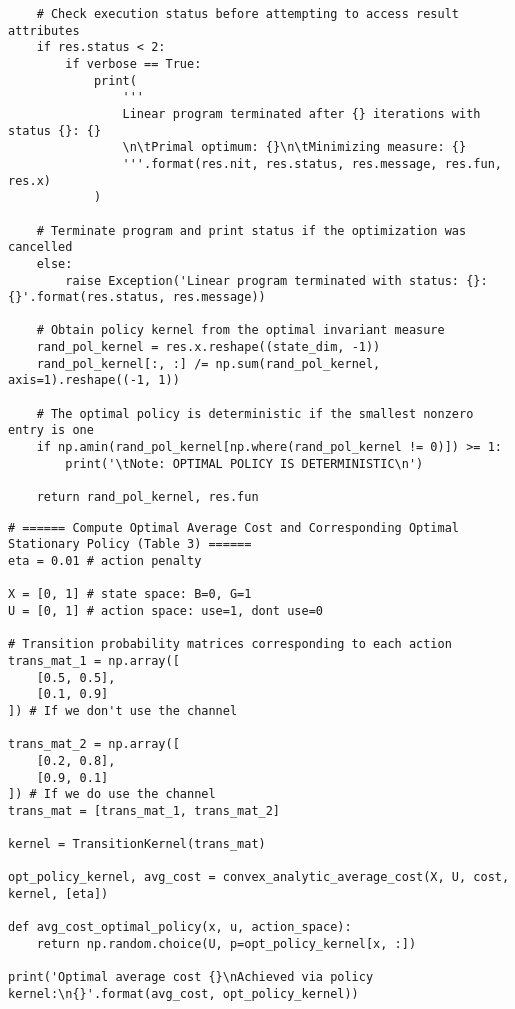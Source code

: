 \documentclass[10pt]{article}
\newcommand{\1}[1]{\mathbbm{1}_{#1}}
\begin{document}
\begin{verbatim}
    # Check execution status before attempting to access result attributes
    if res.status < 2:
        if verbose == True:
            print(
                '''
                Linear program terminated after {} iterations with status {}: {}
                \n\tPrimal optimum: {}\n\tMinimizing measure: {}
                '''.format(res.nit, res.status, res.message, res.fun, res.x)
            )
    
    # Terminate program and print status if the optimization was cancelled
    else:
        raise Exception('Linear program terminated with status: {}: {}'.format(res.status, res.message))

    # Obtain policy kernel from the optimal invariant measure
    rand_pol_kernel = res.x.reshape((state_dim, -1))
    rand_pol_kernel[:, :] /= np.sum(rand_pol_kernel, axis=1).reshape((-1, 1))
    
    # The optimal policy is deterministic if the smallest nonzero entry is one
    if np.amin(rand_pol_kernel[np.where(rand_pol_kernel != 0)]) >= 1:
        print('\tNote: OPTIMAL POLICY IS DETERMINISTIC\n')

    return rand_pol_kernel, res.fun
    \end{verbatim}
    \begin{verbatim}
# ====== Compute Optimal Average Cost and Corresponding Optimal Stationary Policy (Table 3) ======
eta = 0.01 # action penalty

X = [0, 1] # state space: B=0, G=1
U = [0, 1] # action space: use=1, dont use=0

# Transition probability matrices corresponding to each action
trans_mat_1 = np.array([
    [0.5, 0.5],
    [0.1, 0.9]
]) # If we don't use the channel

trans_mat_2 = np.array([
    [0.2, 0.8],
    [0.9, 0.1]
]) # If we do use the channel
trans_mat = [trans_mat_1, trans_mat_2]

kernel = TransitionKernel(trans_mat)

opt_policy_kernel, avg_cost = convex_analytic_average_cost(X, U, cost, kernel, [eta])

def avg_cost_optimal_policy(x, u, action_space):
    return np.random.choice(U, p=opt_policy_kernel[x, :])

print('Optimal average cost {}\nAchieved via policy kernel:\n{}'.format(avg_cost, opt_policy_kernel))
    \end{verbatim}
\end{document}
